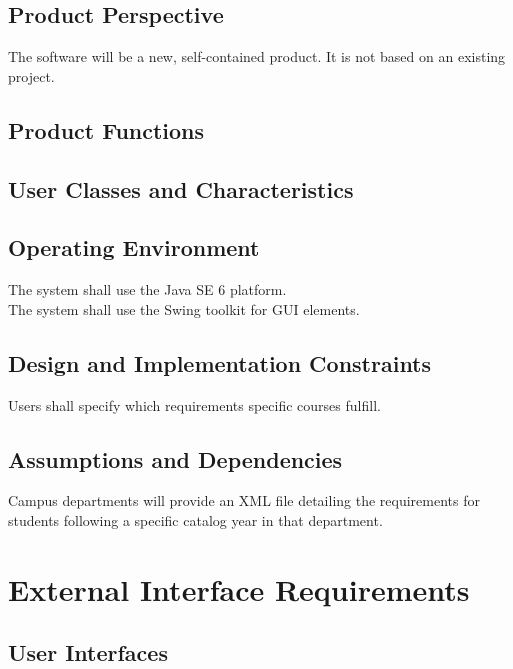 \documentclass{scrreprt}
\begin{document}
\section{Product Perspective}
The software will be a new, self-contained product. It is not based on an existing project.

\section{Product Functions}

\section{User Classes and Characteristics}

\section{Operating Environment}
The system shall use the Java SE 6 platform. \\
The system shall use the Swing toolkit for GUI elements.

\section{Design and Implementation Constraints}
Users shall specify which requirements specific courses fulfill.

\section{Assumptions and Dependencies}
Campus departments will provide an XML file detailing the requirements for students following a specific catalog year in that department. 

\chapter{External Interface Requirements}

\section{User Interfaces}
\end{document}

